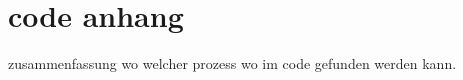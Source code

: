\section{code anhang}
\label{sec:06_code_anhang}
zusammenfassung wo welcher prozess wo im code gefunden werden kann.
